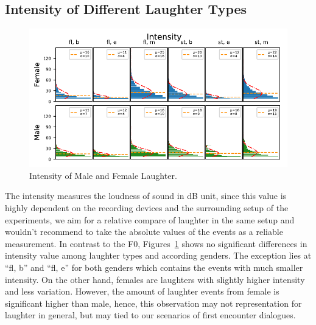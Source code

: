 \documentclass[10pt,journal,compsoc]{IEEEtran}
\begin{document}
\subsection{Intensity of Different Laughter Types}
\begin{figure}[!t]
\centering
\includegraphics[width=1\linewidth]{figures/intensity.pdf}
\caption{Intensity of Male and Female Laughter.}
\label{fig:intensity}
\end{figure}
The intensity measures the loudness of sound in dB unit, since this value is highly dependent on the recording devices and the surrounding setup of the experiments, we aim for a relative compare of laughter in the same setup and wouldn't recommend to take the absolute values of the events as a reliable measurement.
In contrast to the F0, Figures~\ref{fig:intensity} shows no significant differences in intensity value among laughter types and according genders.
The exception lies at ``fl, b'' and ``fl, e'' for both genders which contains the events with much smaller intensity. On the other hand, females are laughters with slightly higher intensity and less variation. However, the amount of laughter events from female is significant higher than male, hence, this observation may not representation for laughter in general, but may tied to our scenarios of first encounter dialogues.
\end{document}
